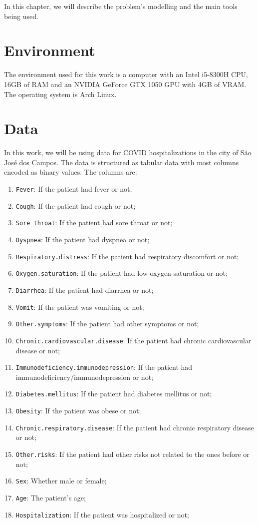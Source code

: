In this chapter, we will describe the problem's modelling and the main tools being used.

\section{Environment} \label{sec:env}

The environment used for this work is a computer with an Intel i5-8300H CPU, 16GB of RAM and an NVIDIA GeForce GTX 1050 GPU with 4GB of VRAM. The operating system is Arch Linux.

\section{Data}

In this work, we will be using data for COVID hospitalizations in the city of São José dos Campos. The data is structured as tabular data with most columns encoded as binary values. The columns are:

\begin{enumerate}
    \item \texttt{Fever}: If the patient had fever or not;
    \item \texttt{Cough}: If the patient had cough or not;
    \item \texttt{Sore throat}: If the patient had sore throat or not;
    \item \texttt{Dyspnea}: If the patient had dyspnea or not;
    \item \texttt{Respiratory.distress}: If the patient had respiratory discomfort or not;
    \item \texttt{Oxygen.saturation}: If the patient had low oxygen saturation or not;
    \item \texttt{Diarrhea}: If the patient had diarrhea or not;
    \item \texttt{Vomit}: If the patient was vomiting or not;
    \item \texttt{Other.symptoms}: If the patient had other symptoms or not;
    \item \texttt{Chronic.cardiovascular.disease}: If the patient had chronic cardiovascular disease or not;
    \item \texttt{Immunodeficiency.immunodepression}: If the patient had immunodeficiency/immunodepression or not;
    \item \texttt{Diabetes.mellitus}: If the patient had diabetes mellitus or not;
    \item \texttt{Obesity}: If the patient was obese or not;
    \item \texttt{Chronic.respiratory.disease}: If the patient had chronic respiratory disease or not;
    \item \texttt{Other.risks}: If the patient had other risks not related to the ones before or not;
    \item \texttt{Sex}: Whether male or female;
    \item \texttt{Age}: The patient's age;
    \item \texttt{Hospitalization}: If the patient was hospitalized or not;
\end{enumerate}

